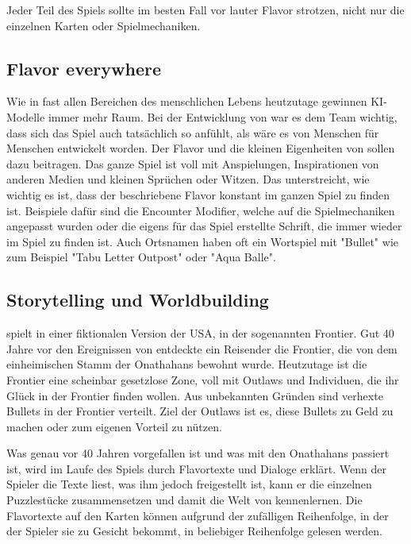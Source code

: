Jeder Teil des Spiels sollte im besten Fall vor lauter Flavor strotzen, nicht nur die einzelnen Karten oder Spielmechaniken.



\subsection{Flavor everywhere}\label{subsec:keinTeildesSpielesOhneFlavor}

Wie in fast allen Bereichen des menschlichen Lebens heutzutage gewinnen KI-Modelle immer mehr Raum. Bei der Entwicklung von \FF war es dem Team wichtig,
dass sich das Spiel auch tatsächlich so anfühlt, als wäre es von Menschen für Menschen entwickelt worden.
Der Flavor und die kleinen Eigenheiten von \FF sollen dazu beitragen.
Das ganze Spiel ist voll mit Anspielungen, Inspirationen von anderen Medien und kleinen Sprüchen oder Witzen.
Das unterstreicht, wie wichtig es ist, dass der beschriebene Flavor konstant im ganzen Spiel zu finden ist.
Beispiele dafür sind die Encounter Modifier, welche auf die Spielmechaniken
angepasst wurden oder die eigens für das Spiel erstellte Schrift, die immer wieder im Spiel zu finden ist. Auch Ortsnamen
haben oft ein Wortspiel mit "Bullet" wie zum Beispiel "Tabu Letter Outpost" oder "Aqua Balle".


\subsection{Storytelling und Worldbuilding}\label{subsec:storytellingUndWorldbuilding}

\FF spielt in einer fiktionalen Version der USA, in der sogenannten Frontier. Gut 40 Jahre vor den Ereignissen von \FF
entdeckte ein Reisender die Frontier, die von dem einheimischen Stamm der Onathahans bewohnt wurde. Heutzutage ist die Frontier
eine scheinbar gesetzlose Zone, voll mit Outlaws und Individuen, die ihr Glück in der Frontier finden wollen.
Aus unbekannten Gründen sind verhexte Bullets in der Frontier verteilt. Ziel der Outlaws ist es, diese Bullets zu Geld
zu machen oder zum eigenen Vorteil zu nützen.


Was genau vor 40 Jahren vorgefallen ist und was mit den Onathahans
passiert ist, wird im Laufe des Spiels durch Flavortexte und Dialoge erklärt. Wenn der Spieler die Texte liest,
was ihm jedoch freigestellt ist, kann er die einzelnen Puzzlestücke zusammensetzen und damit die Welt von \FF kennenlernen.
Die Flavortexte auf den Karten können aufgrund der zufälligen Reihenfolge, in der der Spieler sie zu Gesicht bekommt, in beliebiger Reihenfolge gelesen werden.



